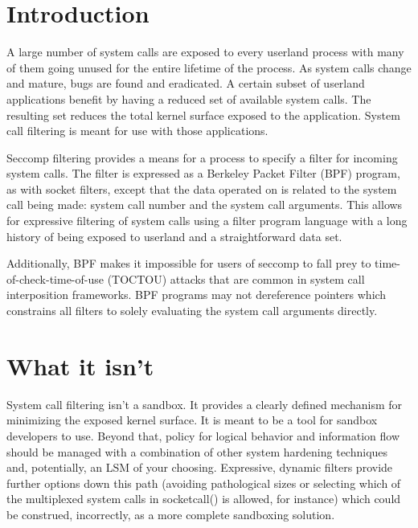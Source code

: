 \documentclass[a4paper,8pt,english]{sphinxmanual}
\begin{document}
\section{Introduction}
\label{userspace-api/seccomp_filter:introduction}
A large number of system calls are exposed to every userland process
with many of them going unused for the entire lifetime of the process.
As system calls change and mature, bugs are found and eradicated.  A
certain subset of userland applications benefit by having a reduced set
of available system calls.  The resulting set reduces the total kernel
surface exposed to the application.  System call filtering is meant for
use with those applications.

Seccomp filtering provides a means for a process to specify a filter for
incoming system calls.  The filter is expressed as a Berkeley Packet
Filter (BPF) program, as with socket filters, except that the data
operated on is related to the system call being made: system call
number and the system call arguments.  This allows for expressive
filtering of system calls using a filter program language with a long
history of being exposed to userland and a straightforward data set.

Additionally, BPF makes it impossible for users of seccomp to fall prey
to time-of-check-time-of-use (TOCTOU) attacks that are common in system
call interposition frameworks.  BPF programs may not dereference
pointers which constrains all filters to solely evaluating the system
call arguments directly.


\section{What it isn't}
\label{userspace-api/seccomp_filter:what-it-isn-t}
System call filtering isn't a sandbox.  It provides a clearly defined
mechanism for minimizing the exposed kernel surface.  It is meant to be
a tool for sandbox developers to use.  Beyond that, policy for logical
behavior and information flow should be managed with a combination of
other system hardening techniques and, potentially, an LSM of your
choosing.  Expressive, dynamic filters provide further options down this
path (avoiding pathological sizes or selecting which of the multiplexed
system calls in socketcall() is allowed, for instance) which could be
construed, incorrectly, as a more complete sandboxing solution.
\end{document}
